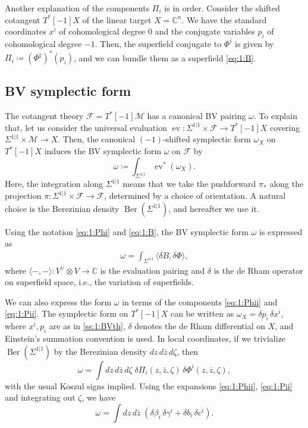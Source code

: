 \documentclass[final,reqno]{amsart}
\numberwithin{equation}{section}
\theoremstyle{definition}
\newcommand{\ol}{\overline}
\newcommand{\ceq}{\coloneqq} %
\newcommand{\bbC}{\mathbb{C}}
\newcommand{\clF}{\mathcal{F}}
\newcommand{\clM}{\mathcal{M}}
\newcommand{\sSig}{\Sigma^{1|1}}
\newcommand{\pair}[1]{\langle #1 \rangle}
\DeclareMathOperator{\evl}{ev}
\DeclareMathOperator{\Ber}{Ber}
\begin{document}
Another explanation of the components $\Pi_i$ is in order.
Consider the shifted cotangent $T^*[-1]X$ of the linear target $X=\bbC^n$. 
We have the standard coordinates $x^i$ of cohomological degree $0$ 
and the conjugate variables $p_i$ of cohomological degree $-1$.
Then, the superfield conjugate to $\Phi^i$ is given by 
$\Pi_i \ceq (\Phi^\sharp)^*(p_i)$, 
and we can bundle them as a superfield \eqref{eq:1:B}.

\subsection{BV symplectic form}\label{ss:1:BVform}

The cotangent theory $\clF=T^*[-1]\clM$ has a canonical BV pairing $\omega$. 
To explain that, let us consider the universal evaluation
$\evl\colon \sSig \times \clF \to T^*[-1]X$ 
covering $\sSig \times \clM \to X$.
Then, the canonical $(-1)$-shifted symplectic form $\omega_X$ on $T^*[-1]X$ 
induces the BV symplectic form $\omega$ on $\clF$ by 
\[
 \omega \ceq \int_{\sSig} \evl^*(\omega_X).
\]
Here, the integration along $\sSig$ means that 
we take the pushforward $\pi_*$ along the projection 
$\pi\colon \sSig \times \clF \to \clF$, determined by a choice of orientation.
A natural choice is the Berezinian density $\Ber(\sSig)$, 
and hereafter we use it.

Using the notation \eqref{eq:1:Phi} and \eqref{eq:1:B}, 
the BV symplectic form $\omega$ is expressed as 
\begin{align}\label{eq:1:omega}
 \omega = \int_{\sSig} \pair{ \delta B, \delta \Phi },
\end{align}
where $\pair{-,-}\colon V^\vee \otimes V \to \bbC$ is the evaluation pairing
and $\delta$ is the de Rham operator on superfield space, 
i.e., the variation of superfields. 

We can also express the form $\omega$ 
in terms of the components \eqref{eq:1:Phii} and \eqref{eq:1:Pii}.
The symplectic form on $T^*[-1]X$ can be written as 
$\omega_X=\delta p_i \, \delta x^i$,
where $x^i,p_i$ are as in \cref{ss:1:BVth},  
$\delta$ denotes the de Rham differential on $X$,
and Einstein's summation convention is used. 
In local coordinates, if we trivialize $\Ber(\sSig)$
by the Berezinian density $dz\,d\ol{z}\,d\zeta$, then
\[
 \omega = \int dz\,d\ol{z}\,d\zeta\;
 \delta \Pi_i(z,\ol{z},\zeta) \, \delta \Phi^i(z,\ol{z},\zeta),
\]
with the usual Koszul signs implied.
Using the expansions \eqref{eq:1:Phii}, \eqref{eq:1:Pii} 
and integrating out $\zeta$, we have 
\[
 \omega = \int dz\,d\ol{z}\;
 (\delta\beta_i\,\delta\gamma^i + \delta b_i\,\delta c^i).
\]
\end{document}
